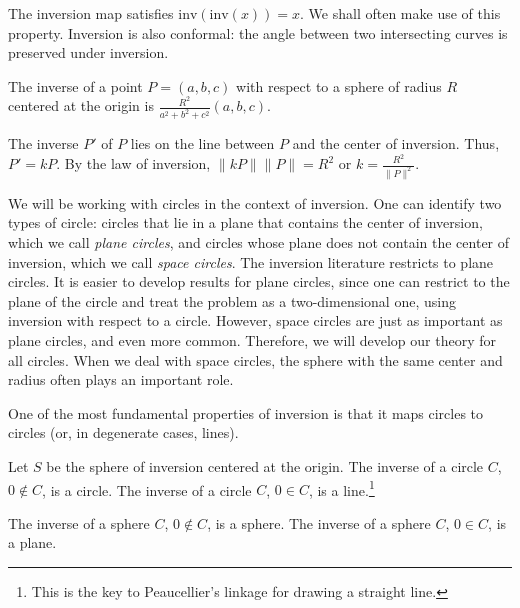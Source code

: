  
The inversion map satisfies $\mbox{inv}(\mbox{inv}(x)) = x$.
We shall often make use of this property.
Inversion is also conformal: the angle between two intersecting 
curves is preserved under inversion.

\begin{lemma}
\label{lem-inv}
The inverse of a point $P = (a,b,c)$ with respect to a sphere
of radius $R$ centered at the origin is 
$\frac{R^{2}}{a^{2} + b^{2} + c^{2}} (a,b,c)$.
\end{lemma}
The inverse $P'$ of $P$ lies on the line between $P$ and the 
center of inversion.
Thus, $P' = kP$.
By the law of inversion, $\|kP\| \|P\| = R^{2}$ or
$k = \frac{R^{2}}{\|P\|^{2}}$.
\QED

We will be working with circles in the context of inversion.
One can identify two types of circle: circles that lie in a plane
that contains the center of inversion, which we call {\em plane circles},
and circles whose plane does not contain the center of inversion,
which we call {\em space circles}.
The inversion literature restricts to plane circles.
It is easier to develop results for plane circles,
since one can restrict to the plane of the circle and treat
the problem as a two-dimensional one, using inversion with respect to a circle.
However, space circles are just as important as plane circles, and even more
common.
Therefore, we will develop our theory for all circles.
When we deal with space circles, the sphere with the same center and radius
often plays an important role.

One of the most fundamental properties of inversion is that it maps
circles to circles (or, in degenerate cases, lines).

\begin{lemma}
\label{lem:inversion}
\cite{D49,Coo71}
Let $S$ be the sphere of inversion centered at the origin.
The inverse of a circle $C$, $0 \not\in C$, is a circle.
The inverse of a circle $C$, $0 \in C$,     is a line.\footnote{This is 
	the key to Peaucellier's linkage for drawing a straight line.}

The inverse of a sphere $C$, $0 \not\in C$, is a sphere.
The inverse of a sphere $C$, $0 \in C$, is a plane.
\end{lemma}

